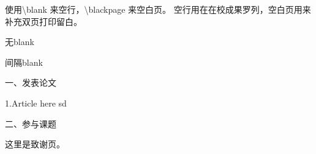 \documentclass[AutoFakeBold]{LZUThesis}
\begin{document}
使用\textbackslash blank 来空行，\textbackslash blackpage 来空白页。
空行用在在校成果罗列，空白页用来补充双页打印留白。

无blank

\blank

间隔blank
\blankpage




\backmatter


\printbib



\Achievements
一、发表论文

1.Article here sd

\blank

二、参与课题




\Thanks

这里是致谢页。
\end{document}
